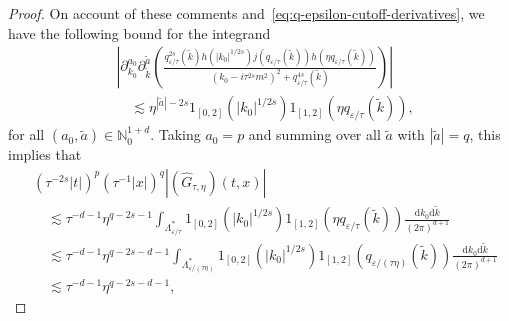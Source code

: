 \documentclass{article}
\numberwithin{equation}{section}
\newcommand{\mathd}{\mathrm{d}}
\theoremstyle{plain}
\theoremstyle{definition}
\begin{document}
\begin{proof}
  On account of these comments and~\eqref{eq:q-epsilon-cutoff-derivatives},
  we have the following bound for the integrand
  \begin{align*}
    &\left| \partial_{k_0}^{a_0} \partial_{\tilde{k}}^{\tilde{a}} \left(
    \frac{q^{2 s}_{\varepsilon / \tau} (\tilde{k})
    h \left( | k_0 |^{1 / 2 s} \right)
    j(q _{\varepsilon / \tau} (\tilde{k}))
    h(\eta q _{\varepsilon / \tau} (\tilde{k}))
    }
    {(k_0 - i \tau^{2 s} m^2)^2
    + q^{4 s}_{\varepsilon / \tau}(\tilde{k})}
    \right) \right|\\
    &\quad \lesssim \eta^{| \tilde{a} | - 2 s}
    1_{[0, 2]} (| k_0 |^{1 / 2 s})
    1_{[1, 2]} (\eta q _{\varepsilon / \tau }(\tilde{k})),
  \end{align*}
  for all $(a_0, ) \in {}_0^{1 + d}$. Taking $a_0=p$
  and summing over all $\tilde a$ with $|\tilde a|=q$, this implies that
  \begin{align*}
    &(\tau^{- 2 s} | t |)^p (\tau^{- 1} | x |)^q
    | (\hat{G}_{\tau, \eta}) (t, x) |\\
    &\quad \lesssim \tau^{- d - 1} \eta^{q - 2 s - 1}
    \int_{\Lambda^{\ast}_{\varepsilon / \tau}}
    1_{[0, 2]} (| k_0 |^{1 / 2 s})
    1_{[1, 2]} (\eta q _{\varepsilon / \tau } (\tilde{k}))
    \frac{\mathd k_0 \mathd \tilde{k}}{(2 \pi)^{d + 1}}\\
    &\quad \lesssim \tau^{- d - 1} \eta^{q - 2 s - d - 1}
    \int_{\Lambda^{\ast}_{\varepsilon / (\tau \eta)}}
    1_{[0, 2]} (| k_0 |^{1 / 2 s})
    1_{[1, 2]} (q _{\varepsilon / (\tau \eta)} (\tilde{k}))
    \frac{\mathd k_0 \mathd \tilde{k}}{(2 \pi)^{d + 1}}\\
    &\quad \lesssim \tau^{- d - 1} \eta^{q - 2 s - d - 1},

\end{align*}
\end{proof}
\end{document}
